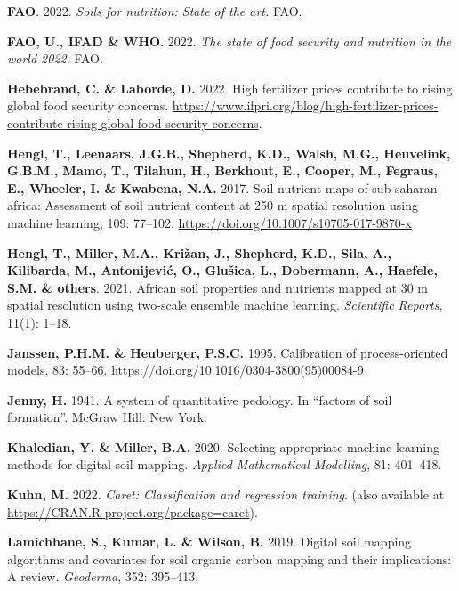 \documentclass[
  10pt,
  b5paper,
  oneside]{book}
\newlength{\cslhangindent}
\newlength{\cslentryspacingunit} %
\newenvironment{CSLReferences}[2] %
 {%
  \setlength{\parindent}{0pt}
  \ifodd #1
  \let\oldpar\par
  \def\par{\hangindent=\cslhangindent\oldpar}
  \fi
  \setlength{\parskip}{#2\cslentryspacingunit}
 }%
 {}
\begin{document}
\begin{CSLReferences}{0}{0}
\leavevmode{}%
\textbf{FAO}. 2022. \emph{Soils for nutrition: State of the art.} FAO.

\leavevmode{}%
\textbf{FAO, U., IFAD \& WHO}. 2022. \emph{The state of food security and nutrition in the world 2022}. FAO.

\leavevmode{}%
\textbf{Hebebrand, C. \& Laborde, D.} 2022. High fertilizer prices contribute to rising global food security concerns. \url{https://www.ifpri.org/blog/high-fertilizer-prices-contribute-rising-global-food-security-concerns}.

\leavevmode{}%
\textbf{Hengl, T., Leenaars, J.G.B., Shepherd, K.D., Walsh, M.G., Heuvelink, G.B.M., Mamo, T., Tilahun, H., Berkhout, E., Cooper, M., Fegraus, E., Wheeler, I. \& Kwabena, N.A.} 2017. Soil nutrient maps of sub-saharan africa: Assessment of soil nutrient content at 250 m spatial resolution using machine learning, 109: 77--102. \url{https://doi.org/10.1007/s10705-017-9870-x}

\leavevmode{}%
\textbf{Hengl, T., Miller, M.A., Križan, J., Shepherd, K.D., Sila, A., Kilibarda, M., Antonijević, O., Glušica, L., Dobermann, A., Haefele, S.M. \& others}. 2021. African soil properties and nutrients mapped at 30 m spatial resolution using two-scale ensemble machine learning. \emph{Scientific Reports}, 11(1): 1--18.

\leavevmode{}%
\textbf{Janssen, P.H.M. \& Heuberger, P.S.C.} 1995. Calibration of process-oriented models, 83: 55--66. \url{https://doi.org/10.1016/0304-3800(95)00084-9}

\leavevmode{}%
\textbf{Jenny, H.} 1941. A system of quantitative pedology. In {``factors of soil formation''}. McGraw Hill: New York.

\leavevmode{}%
\textbf{Khaledian, Y. \& Miller, B.A.} 2020. Selecting appropriate machine learning methods for digital soil mapping. \emph{Applied Mathematical Modelling}, 81: 401--418.

\leavevmode{}%
\textbf{Kuhn, M.} 2022. \emph{Caret: Classification and regression training}. (also available at \url{https://CRAN.R-project.org/package=caret}).

\leavevmode{}%
\textbf{Lamichhane, S., Kumar, L. \& Wilson, B.} 2019. Digital soil mapping algorithms and covariates for soil organic carbon mapping and their implications: A review. \emph{Geoderma}, 352: 395--413.


\end{CSLReferences}
\end{document}
